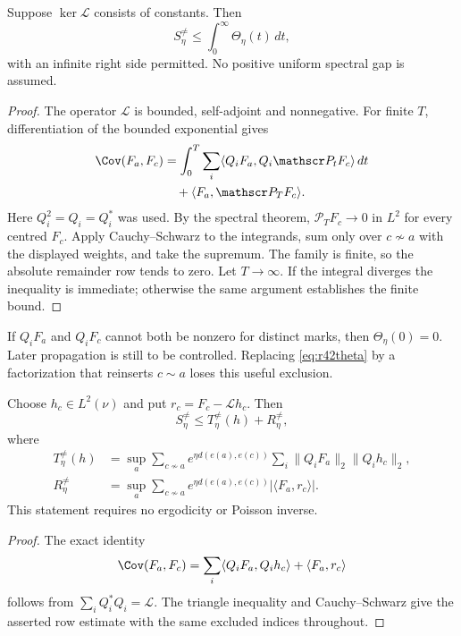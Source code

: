 \begin{proposition}\label{prop:r42semigroup}
Suppose $\ker\mathscr L$ consists of constants. Then
\begin{equation}\label{eq:r42integrated}
 S_\eta^{\ne}\le\int_0^\infty\Theta_\eta(t)\,dt,
\end{equation}
with an infinite right side permitted. No positive uniform spectral
gap is assumed.
\end{proposition}
\begin{proof}
The operator $\mathscr L$ is bounded, self-adjoint and nonnegative.
For finite $T$, differentiation of the bounded exponential gives
\begin{align}
 \Cov(F_a,F_c)
 &=\int_0^T\sum_i
       \langle Q_iF_a,Q_i\mathscr P_tF_c\rangle\,dt\nonumber\\
 &\quad+\langle F_a,\mathscr P_TF_c\rangle.
 \label{eq:r42finiteT}
\end{align}
Here $Q_i^2=Q_i=Q_i^*$ was used. By the spectral theorem,
$\mathscr P_TF_c\to0$ in $L^2$ for every centred $F_c$.
Apply Cauchy--Schwarz to the integrands, sum only over
$c\not\sim a$ with the displayed weights, and take the supremum.
The family is finite, so the absolute remainder row tends to zero.
Let $T\to\infty$. If the integral diverges the inequality is immediate;
otherwise the same argument establishes the finite bound.
\end{proof}

If $Q_iF_a$ and $Q_iF_c$ cannot both be nonzero for distinct marks,
then $\Theta_\eta(0)=0$. Later propagation is still to be controlled.
Replacing \eqref{eq:r42theta} by a factorization that reinserts
$c\sim a$ loses this useful exclusion.

\begin{proposition}
\label{prop:r42static}
Choose $h_c\in L^2(\nu)$ and put $r_c=F_c-\mathscr Lh_c$. Then
\begin{equation}\label{eq:r42static}
 S_\eta^{\ne}\le T_\eta^{\ne}(h)+R_\eta^{\ne},
\end{equation}
where
\begin{align*}
 T_\eta^{\ne}(h)&=\sup_a\sum_{c\not\sim a}
    e^{\eta d(e(a),e(c))}\sum_i\|Q_iF_a\|_2\|Q_ih_c\|_2,\\
 R_\eta^{\ne}&=\sup_a\sum_{c\not\sim a}
    e^{\eta d(e(a),e(c))}|\langle F_a,r_c\rangle|.
\end{align*}
This statement requires no ergodicity or Poisson inverse.
\end{proposition}
\begin{proof}
The exact identity
\[
 \Cov(F_a,F_c)=\sum_i\langle Q_iF_a,Q_ih_c\rangle
                         +\langle F_a,r_c\rangle
\]
follows from $\sum_iQ_i^*Q_i=\mathscr L$. The triangle inequality and
Cauchy--Schwarz give the asserted row estimate with the same excluded
indices throughout.
\end{proof}

